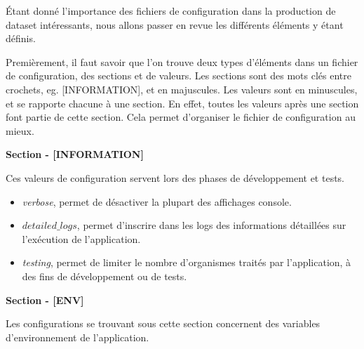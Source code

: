 Étant donné l'importance des fichiers de configuration dans la production de dataset intéressants, nous allons passer en revue les différents éléments y étant définis.

Premièrement, il faut savoir que l'on trouve deux types d'éléments dans un fichier de configuration, des sections et de valeurs. Les sections sont des mots clés entre crochets, eg. [INFORMATION], et en majuscules. Les valeurs sont en minuscules, et se rapporte chacune à une section. En effet, toutes les valeurs après une section font partie de cette section. Cela permet d'organiser le fichier de configuration au mieux.

\textbf{Section - [INFORMATION]}

Ces valeurs de configuration servent lors des phases de développement et tests.

\begin{itemize}
\item \emph{verbose}, permet de désactiver la plupart des affichages console.
\item \emph{$detailed\_logs$}, permet d'inscrire dans les logs des informations détaillées sur l'exécution de l'application.
\item \emph{testing}, permet de limiter le nombre d'organismes traités par l'application, à des fins de développement ou de tests. 
\end{itemize}

\textbf{Section - [ENV]}

Les configurations se trouvant sous cette section concernent des variables d'environnement de l'application.

